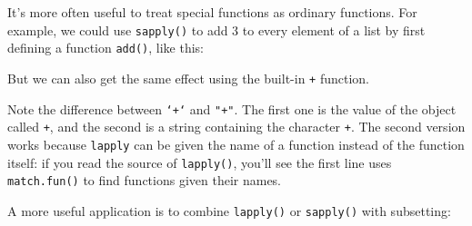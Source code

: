 It's more often useful to treat special functions as ordinary functions.
For example, we could use \texttt{sapply()} to add 3 to every element of
a list by first defining a function \texttt{add()}, like this:

\begin{Shaded}
\begin{Highlighting}[]
\StringTok{ }\StringTok{ }
\NormalTok{(}\NormalTok{:}\NormalTok{)}
\end{Highlighting}
\end{Shaded}

But we can also get the same effect using the built-in \texttt{+}
function.

\begin{Shaded}
\begin{Highlighting}[]
\NormalTok{(}\NormalTok{:}\NormalTok{, }\DataTypeTok{+}\NormalTok{, }\NormalTok{)}
\NormalTok{(}\NormalTok{:}\NormalTok{, }\NormalTok{, }\NormalTok{)}
\end{Highlighting}
\end{Shaded}

Note the difference between \texttt{`+`} and \texttt{"+"}. The first one
is the value of the object called \texttt{+}, and the second is a string
containing the character \texttt{+}. The second version works because
\texttt{lapply} can be given the name of a function instead of the
function itself: if you read the source of \texttt{lapply()}, you'll see
the first line uses \texttt{match.fun()} to find functions given their
names.

A more useful application is to combine \texttt{lapply()} or
\texttt{sapply()} with subsetting:

\begin{Shaded}
\begin{Highlighting}[]
\StringTok{ }\NormalTok{(}\NormalTok{:}\NormalTok{, }\NormalTok{:}\NormalTok{, }\NormalTok{:}\NormalTok{)}
\StringTok{"["}\NormalTok{, }\NormalTok{)}

\NormalTok{(x, function(x) x[}\NormalTok{])}
\end{Highlighting}
\end{Shaded}

